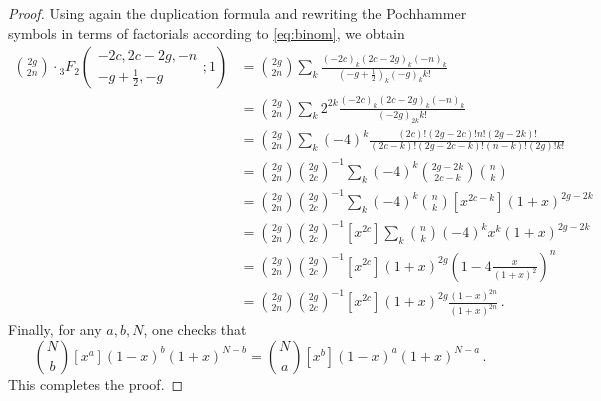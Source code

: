 \documentclass[11pt]{article}
\theoremstyle{definition}
\begin{document}
\begin{proof}
    Using again the duplication formula and rewriting the Pochhammer symbols in terms of factorials according to \eqref{eq:binom}, we obtain
    {\allowdisplaybreaks
    \begin{align*}
    \binom{2g}{2n}\cdot{}_{3}{F}_2\left(\begin{array}{c}
        -2c, 2c-2g, -n \\
        -g+\frac{1}{2}, -g
    \end{array};1\right) &= \binom{2g}{2n}\sum_{k}\frac{(-2c)_k(2c-2g)_k(-n)_k}{(-g+\frac{1}{2})_k (-g)_k k!}\\
    &=\binom{2g}{2n}\sum_{k}2^{2k}\frac{(-2c)_k(2c-2g)_k(-n)_k}{(-2g)_{2k} k!}\\
    &=\binom{2g}{2n}\sum_{k}(-4)^{k}\frac{(2c)!(2g-2c)!n!(2g-2k)!}{(2c-k)!(2g-2c-k)!(n-k)!(2g)! k!}\\
    &=\binom{2g}{2n}\binom{2g}{2c}^{-1}\sum_{k}(-4)^{k}\binom{2g-2k}{2c-k}\binom{n}{k}\\
    &=\binom{2g}{2n}\binom{2g}{2c}^{-1}\sum_{k}(-4)^{k}\binom{n}{k}[x^{2c-k}](1+x)^{2g-2k}\\
    &=\binom{2g}{2n}\binom{2g}{2c}^{-1}[x^{2c}]\sum_{k}\binom{n}{k}(-4)^{k}x^k(1+x)^{2g-2k}\\
    &=\binom{2g}{2n}\binom{2g}{2c}^{-1}[x^{2c}](1+x)^{2g}\left(1-4\frac{x}{(1+x)^2}\right)^n\\
    &=\binom{2g}{2n}\binom{2g}{2c}^{-1}[x^{2c}](1+x)^{2g}\frac{(1-x)^{2n}}{(1+x)^{2n}}\,.
    \end{align*}
    }
    Finally, for any $a,b,N$, one checks that
    $$
    \binom{N}{b}[x^a](1-x)^{b}(1+x)^{N-b} = \binom{N}{a}[x^b](1-x)^{a}(1+x)^{N-a}\, .
    $$
    This completes the proof.
\end{proof}
\end{document}
